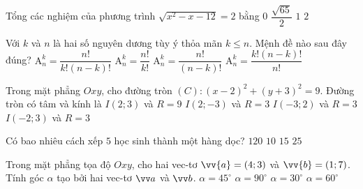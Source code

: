 \begin{ex}%
Tổng các nghiệm của phương trình $ \sqrt{x^{2}-x-12} = 2 $ bằng
\choice
{$ 0 $}
{$ \dfrac{\sqrt{65}}{2} $}
{\True $ 1 $}
{$ 2 $}
\end{ex}

\begin{ex}%
Với $ k $ và $ n $ là hai số nguyên dương tùy ý thỏa mãn $ k \le n $. Mệnh đề nào sau đây đúng?
\choice
{$ \mathrm{A}_{n}^{k} = \dfrac{n!}{k! (n-k)!} $}
{$ \mathrm{A}_{n}^{k} = \dfrac{n!}{k!} $}
{\True $ \mathrm{A}_{n}^{k} = \dfrac{n!}{(n-k)!} $}
{$ \mathrm{A}_{n}^{k} = \dfrac{k! (n-k)!}{n!} $}
\end{ex}

\begin{ex}%
Trong mặt phẳng $ Oxy $, cho đường tròn $ (C) \colon (x-2)^{2}+(y+3)^{2}=9 $. Đường tròn có tâm và kính là
\choice
{$ I(2;3) $ và $ R = 9 $}
{\True $ I(2;-3) $ và $ R = 3 $}
{$ I(-3;2) $ và $ R = 3 $}
{$ I(-2;3) $ và $ R = 3 $}
\end{ex}

\begin{ex}%
Có bao nhiêu cách xếp $ 5 $ học sinh thành một hàng dọc?
\choice
{\True $ 120 $}
{$ 10 $}
{$ 15 $}
{$ 25 $}
\end{ex}

\begin{ex}%
Trong mặt phẳng tọa độ $ Oxy $, cho hai vec-tơ $ \vv{a} = (4;3) $ và $ \vv{b} = (1;7) $. Tính góc $ \alpha $ tạo bởi hai vec-tơ $ \vv a $ và $ \vv b $.
\choice
{\True $ \alpha = 45^{\circ} $}
{$ \alpha = 90^{\circ} $}
{$ \alpha = 30^{\circ} $}
{$ \alpha = 60^{\circ} $}
\end{ex}

